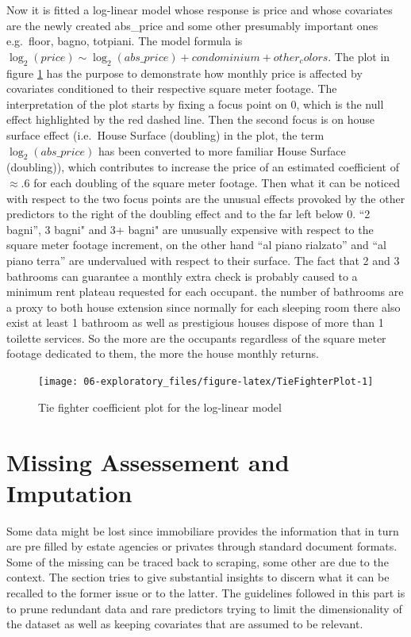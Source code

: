 \documentclass[
  12pt,
  a4paper,
  oneside]{book}
\theoremstyle{definition}
\theoremstyle{definition}
\theoremstyle{definition}
\theoremstyle{remark}
\begin{document}
Now it is fitted a log-linear model whose response is price and whose covariates are the newly created abs\_price and some other presumably important ones e.g.~floor, bagno, totpiani. The model formula is \(\log_{2}(price) \sim \log_{2}(abs\_price) + condominium + other_colors\).
The plot in figure \ref{fig:TieFighterPlot} has the purpose to demonstrate how monthly price is affected by covariates conditioned to their respective square meter footage. The interpretation of the plot starts by fixing a focus point on 0, which is the null effect highlighted by the red dashed line. Then the second focus is on house surface effect (i.e.~House Surface (doubling) in the plot, the term \(\log_{2}(abs\_price)\) has been converted to more familiar House Surface (doubling)), which contributes to increase the price of an estimated coefficient of \(\approx .6\) for each doubling of the square meter footage. Then what it can be noticed with respect to the two focus points are the unusual effects provoked by the other predictors to the right of the doubling effect and to the far left below 0. ``2 bagni'', 3 bagni" and 3+ bagni" are unusually expensive with respect to the square meter footage increment, on the other hand ``al piano rialzato'' and ``al piano terra'' are undervalued with respect to their surface. The fact that 2 and 3 bathrooms can guarantee a monthly extra check is probably caused to a minimum rent plateau requested for each occupant. the number of bathrooms are a proxy to both house extension since normally for each sleeping room there also exist at least 1 bathroom as well as prestigious houses dispose of more than 1 toilette services. So the more are the occupants regardless of the square meter footage dedicated to them, the more the house monthly returns.

\begin{figure}

{\centering \texttt{[image: 06-exploratory\_files/figure-latex/TieFighterPlot-1]} 

}

\caption{Tie fighter coefficient plot for the log-linear model}\label{fig:TieFighterPlot}
\end{figure}

\hypertarget{missassimp}{%
\section{Missing Assessement and Imputation}\label{missassimp}}

Some data might be lost since immobiliare provides the information that in turn are pre filled by estate agencies or privates through standard document formats. Some of the missing can be traced back to scraping, some other are due to the context. The section tries to give substantial insights to discern what it can be recalled to the former issue or to the latter. The guidelines followed in this part is to prune redundant data and rare predictors trying to limit the dimensionality of the dataset as well as keeping covariates that are assumed to be relevant.
\end{document}
